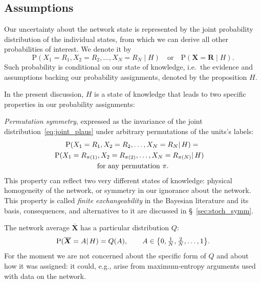 \documentclass{article}
\newcommand*{\citep}{\parencites}
\theoremstyle{innote}
\providecommand{\defaultlists}{}
\newcommand*{\av}{\overline} %
\newcommand*{\yX}{\bm{X}}%
\newcommand*{\yXf}{\av{\yX}}%
\newcommand*{\yR}{\bm{R}}%
\newcommand*{\yH}{\varEta}
\DeclarePairedDelimiter\set{\{}{\}}
\newcommand*{\ie}{{i.e.}}
\newcommand*{\eg}{{e.g.}}
\newcommand*{\cond}%
{\mathpunct{|}}%
\DeclareMathOperator{\pr}{P}%
\newcommand*{\p}{\mathrm{P}}%
\renewcommand*{\|}{\cond}
\newcommand*{\+}{\lor}
\newcommand*{\sect}{\S}%
\let\varEta H
\begin{document}
\subsection{Assumptions}
\label{sec:assumptions}

Our uncertainty about the network state is represented by the joint
probability distribution of the individual states, from which we can
derive all other probabilities of interest. We denote it by
\begin{equation}
  \label{eq:joint_plaus}
  \p(X_1=R_1, X_2=R_2, \dotsc, X_N=R_N \cond \yH) \quad\text{or}\quad
\p(\yX =\yR \cond \yH).
\end{equation}
Such probability is conditional on our state of knowledge, \ie\ the
evidence and assumptions backing our probability assignments, denoted by
the proposition $\yH$.

In the present discussion, $\yH$ is a state of knowledge that leads to two
specific properties in our probability assignments:
\defaultlists

\medskip
\begin{asparaenum}[$\yH$1.]
\item \emph{Permutation symmetry}, expressed as the invariance of the
  joint distribution~\eqref{eq:joint_plaus} under arbitrary permutations of
  the units's labels:
\begin{multline}
  \label{eq:homog_math}
  \p(X_1=R_1, X_2=R_2, \dotsc, X_N=R_N \cond \yH) ={}
\\
\shoveright{\p(X_1=R_{\pi(1)}, X_2=R_{\pi(2)}, \dotsc, X_N=R_{\pi(N)} \cond \yH)}
\\
\text{for any permutation $\pi$}.
\end{multline}
This property can reflect two very different states of knowledge: physical
homogeneity of the network, or symmetry in our ignorance about the network.
This property is called \emph{finite exchangeability} in the Bayesian
literature and its basis, consequences, and alternatives to it are discussed
in \sect~\ref{sec:stoch_symm}.

\medskip

\item The network average $\yXf$ has a particular distribution $Q$:
\begin{equation}
  \label{eq:pop_average_Q}
  \p(\yXf = A \cond \yH)
=  Q(A),
\qquad
A \in \set*{0,\tfrac{1}{N},\tfrac{2}{N},\dotsc,1}.
\end{equation}
For the moment we are not concerned about the specific form of $Q$ and
about how it was assigned: it could, \eg, arise from maximum-entropy
arguments
\citep[\eg:][]{jaynes1957,jaynes1963,good1963,jaynes1967,aczeletal1975,jaynes1979b,vancampenhoutetal1981,sivia1990,fangetal1997,bretthorst2013}
used with data on the network.
\end{asparaenum}
\end{document}
